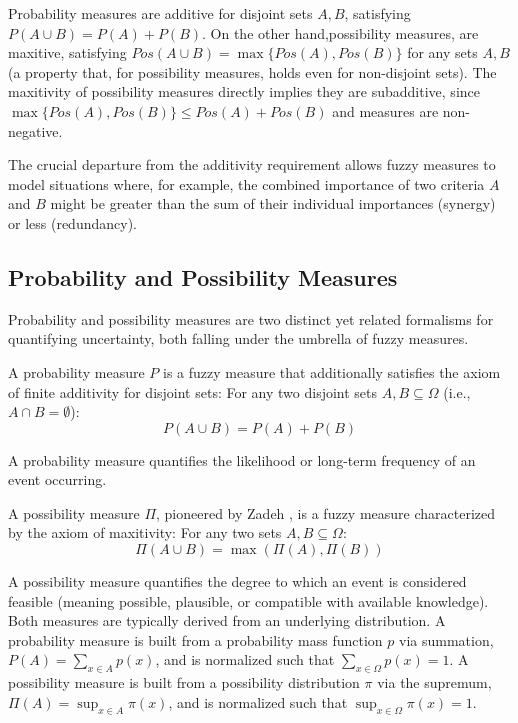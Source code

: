 \begin{example}
    Probability measures are additive for disjoint sets $A,B$, satisfying $P(A \cup B) = P(A) + P(B)$. On the other hand,possibility measures, are maxitive, satisfying $Pos(A \cup B) = \max\{Pos(A), Pos(B)\}$ for any sets $A,B$ (a property that, for possibility measures, holds even for non-disjoint sets). The maxitivity of possibility measures directly implies they are subadditive, since $\max\{Pos(A), Pos(B)\} \leq Pos(A) + Pos(B)$ and measures are non-negative.
\end{example}


The crucial departure from the additivity requirement allows fuzzy measures to model situations where, for example, the combined importance of two criteria $A$ and $B$ might be greater than the sum of their individual importances (synergy) or less (redundancy). 



\subsection{Probability and Possibility Measures}
Probability and possibility measures are two distinct yet related formalisms for quantifying uncertainty, both falling under the umbrella of fuzzy measures.

\begin{definition}
A probability measure $P$ is a fuzzy measure that additionally satisfies the axiom of finite additivity for disjoint sets:
For any two disjoint sets $A, B \subseteq \Omega$ (i.e., $A \cap B = \emptyset$):
\[ P(A \cup B) = P(A) + P(B) \]
\end{definition}
A probability measure quantifies the likelihood or long-term frequency of an event occurring. 


\begin{definition}
A possibility measure $\Pi$, pioneered by Zadeh \cite{Zadeh1978}, is a fuzzy measure characterized by the axiom of maxitivity:
For any two sets $A, B \subseteq \Omega$:
\[ \Pi(A \cup B) = \max(\Pi(A), \Pi(B)) \]
\end{definition}
A possibility measure quantifies the degree to which an event is considered feasible (meaning possible, plausible, or compatible with available knowledge). \\

Both measures are typically derived from an underlying distribution. A probability measure is built from a probability mass function $p$ via summation, $P(A) = \sum_{x \in A} p(x)$, and is normalized such that $\sum_{x \in \Omega} p(x) = 1$. A possibility measure is built from a possibility distribution $\pi$ via the supremum, $\Pi(A) = \sup_{x \in A} \pi(x)$, and is normalized such that $\sup_{x \in \Omega} \pi(x) = 1$.\\


